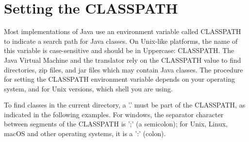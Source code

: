 \section{Setting the CLASSPATH}\label{install_classpath}
Most implementations of Java use an environment variable called
CLASSPATH to indicate a search path for Java classes. On Unix-like
platforms, the name of this variable is case-sensitive and should be
in Uppercase: CLASSPATH. The Java Virtual Machine and the \nr{}
translator rely on the CLASSPATH value to find directories, zip files,
and jar files which may contain Java classes. 
The procedure for setting the CLASSPATH environment variable depends
on your operating system, and for Unix versions, which shell you are
using.
\begin{shaded}
To find classes in the current directory, a '.' must be part of the
CLASSPATH, as indicated in the following examples. For windows, the
separator character between segments of the CLASSPATH is ';' (a
semicolon); for Unix, Linux, macOS and other operating systems, it is
a ':' (colon). 
\end{shaded}

